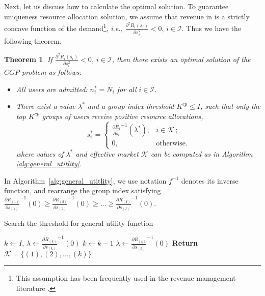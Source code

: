 \documentclass[twocolumn,10pt,twosided]{IEEEtran}
\newtheorem{theorem}{Theorem}
\newcommand{\ie}{\emph{i.e., }}
\begin{document}
Next, let us discuss how to calculate the optimal solution. To
guarantee uniqueness resource allocation solution, we assume that revenue in  is a strictly concave function of the demand\footnote{This assumption has been frequently used in the revenue management literature \cite{talluri2005theory}.}, \ie $\frac{\partial^2 R_i(s_i)}{\partial s_i^2}< 0$, $i\in \mathcal{I}$.
Thus we have the following theorem.
\begin{theorem}
\label{thm:general_utility}
If $\frac{\partial^2 R_i(s_i)}{\partial s_i^2}< 0$, $i\in \mathcal{I}$, then there exists an optimal solution of the $CGP$ problem as follows:
\begin{itemize}
    \item All users are admitted: $n^*_i=N_i$ for all $i\in\mathcal{I}.$
    \item There exist a value $\lambda^\ast$ and a group index threshold $K^{cp} \leq I$, such that only the top $K^{cp}$ groups of users receive positive resource allocations,
\begin{equation}
s_i^*=
    \begin{cases}
\frac{\partial R_i}{\partial s_i}^{-1}(\lambda^*),& i\in\mathcal{K}\,;\\
0, & \text{otherwise}.
     \end{cases}
\end{equation}where values of $\lambda^*$ and effective market $\mathcal{K}$ can  be computed as in Algorithm \ref{alg:general_utitlity}.
\end{itemize}
\end{theorem}

In Algorithm~\ref{alg:general_utitlity}, we use notation $f^{-1}$ denotes its inverse function, and rearrange the group index
satisfying $\frac{\partial R_{(1)}}{\partial s_{(1)}}^{-1}(0)\ge
\frac{\partial R_{(2)}}{\partial s_{(2)}}^{-1}(0)\ge\dots\ge
\frac{\partial R_{(I)}}{\partial s_{(I)}}^{-1}(0)$.
\begin{algorithm}[ht]
\caption{Search the threshold for general utility function}
\label{alg:general_utitlity}
\begin{algorithmic}[1]
\State $k\gets I$, $\lambda \gets \frac{\partial R_{(k)}}{\partial
s_{(k)}}^{-1}(0)$  \State $k \gets k-1$
\State $\lambda \gets \frac{\partial R_{(k)}}{\partial
s_{(k)}}^{-1}(0)$ \EndWhile \State \textbf{Return}
$\mathcal{K}=\{(1),(2),\dots,(k)\}$
\end{algorithmic}
\end{algorithm}
\end{document}

